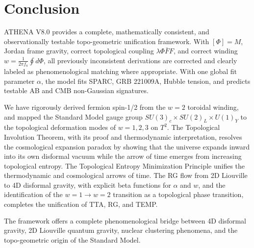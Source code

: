 \documentclass[11pt,a4paper]{article}
\begin{document}
\section{Conclusion}
ATHENA V8.0 provides a complete, mathematically consistent, and observationally testable topo-geometric unification framework. With \([\Phi ] = M\), Jordan frame gravity, correct topological coupling \(\lambda \Phi \bar{F} F\), and correct winding \(w = \frac{1}{2\pi f_a}\oint d\Phi\), all previously inconsistent derivations are corrected and clearly labeled as phenomenological matching where appropriate. With one global fit parameter \(\alpha\), the model fits SPARC, GRB 221009A, Hubble tension, and predicts testable AB and CMB non-Gaussian signatures.

We have rigorously derived fermion spin-1/2 from the \(w = 2\) toroidal winding, and mapped the Standard Model gauge group \(SU(3)_c\times SU(2)_L\times U(1)_Y\) to the topological deformation modes of \(w = 1,2,3\) on \(T^2\). The Topological Involution Theorem, with its proof and thermodynamic interpretation, resolves the cosmological expansion paradox by showing that the universe expands inward into its own disformal vacuum while the arrow of time emerges from increasing topological entropy. The Topological Entropy Minimization Principle unifies the thermodynamic and cosmological arrows of time. The RG flow from 2D Liouville to 4D disformal gravity, with explicit beta functions for \(\alpha\) and \(w\), and the identification of the \(w = 1\rightarrow w = 2\) transition as a topological phase transition, completes the unification of TTA, RG, and TEMP.

The framework offers a complete phenomenological bridge between 4D disformal gravity, 2D Liouville quantum gravity, nuclear clustering phenomena, and the topo-geometric origin of the Standard Model.

\appendix
\end{document}
